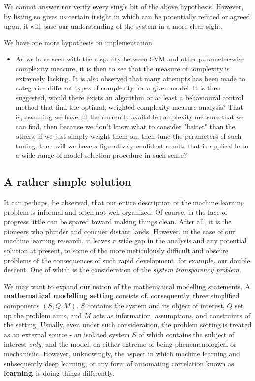 We cannot answer nor verify every single bit of the above hypothesis. However, by listing so gives us certain insight in which can be potentially refuted or agreed upon, it will base our understanding of the system in a more clear sight. 

We have one more hypothesis on implementation. 

\begin{itemize}[noitemsep,topsep=0.5pt]
    \item As we have seen with the disparity between SVM and other parameter-wise complexity measure, it is then to see that the measure of complexity is extremely lacking. It is also observed that many attempts has been made to categorize different types of complexity for a given model. It is then suggested, would there exists an algorithm or at least a behavioural control method that find the optimal, weighted complexity measure analysis? That is, assuming we have all the currently available complexity measure that we can find, then because we don't know what to consider "better" than the others, if we just simply weight them on, then tune the parameters of such tuning, then will we have a figuratively confident results that is applicable to a wide range of model selection procedure in such sense? 
\end{itemize}

\subsection{A rather simple solution}

It can perhaps, be observed, that our entire description of the machine learning problem is informal and often not well-organized. Of course, in the face of progress little can be spared toward making things clean. After all, it is the pioneers who plunder and conquer distant lands. However, in the case of our machine learning research, it leaves a wide gap in the analysis and any potential solution at present, to some of the more meticulously difficult and obscure problems of the consequences of such rapid development, for example, our double descent. One of which is the consideration of the \textit{system transparency problem}. 

We may want to expand our notion of the mathematical modelling statements. A \textbf{mathematical modelling setting} consists of, consequently, three simplified components $(S,Q,M)$. $S$ contains the system and its object of interest, $Q$ set up the problem aims, and $M$ acts as information, assumptions, and constraints of the setting. Usually, even under such consideration, the problem setting is treated as an external source - an isolated system $S$ of which contains the subject of interest \textit{only}, and the model, on either extreme of being phenomenological or mechanistic. However, unknowingly, the aspect in which machine learning and subsequently deep learning, or any form of automating correlation known as \textbf{learning}, is doing things differently. 

